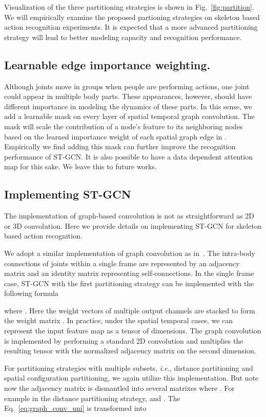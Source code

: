 \documentclass[letterpaper]{article} \usepackage{aaai18}  \usepackage{times}  \usepackage{helvet}  \usepackage{courier}  \usepackage{url}  \usepackage{graphicx}
\begin{document}
Visualization of the three partitioning strategies is shown in Fig.~\ref{fig:partition}. We will empirically examine the proposed partioning strategies on skeleton based action recognition experiments. 
It is expected that a more advanced partitioning strategy will lead to better modeling capacity and recognition performance.



\subsection{Learnable edge importance weighting.}
Although joints move in groups when people are performing actions, one joint could appear in multiple body parts. These appearances, however, should have different importance in modeling the dynamics of these parts. 
In this sense, we add a learnable mask  on every layer of spatial temporal graph convolution. 
The mask will scale the contribution of a node's feature to its neighboring nodes based on the learned importance weight of each spatial graph edge in .
Empirically we find adding this mask can further improve the recognition performance of ST-GCN.
It is also possible to have a data dependent attention map for this sake. We leave this to future works.

\subsection{Implementing ST-GCN}
The implementation of graph-based convolution is not as straightforward as 2D or 3D convolution. 
Here we provide details on implementing ST-GCN for skeleton based action recognition.

We adopt a similar implementation of graph convolution as in~\cite{Kipf2017ICLR}.
The intra-body connections of joints within a single frame are represented by an adjacency matrix  and an identity matrix  representing self-connections.
In the single frame case, ST-GCN with the first partitioning strategy can be implemented with the following formula~\cite{Kipf2017ICLR}

where .
Here the weight vectors of multiple output channels are stacked to form the weight matrix .
In practice, under the spatial temporal cases, we can represent the input feature map as a tensor of  dimensions.
The graph convolution is implemented by performing a  standard 2D convolution and multiplies the resulting tensor with the normalized adjacency matrix  on the second dimension.

For partitioning strategies with multiple subsets, \emph{i.e.}, distance partitioning and spatial configuration partitioning, we again utilize this implementation. 
But note now the adjacency matrix is dismantled into several matrixes  where .
For example in the distance partitioning strategy,  and . 
The Eq.~\ref{eq:graph_conv_uni} is transformed into
\end{document}
